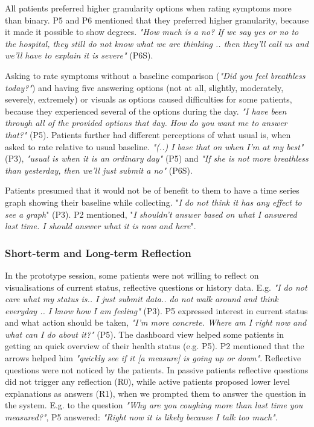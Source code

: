 All patients preferred higher granularity options when rating symptoms more than binary. P5 and P6 mentioned that they preferred higher granularity, because it made it possible to show degrees. \textit{"How much is a no? If we say yes or no to the hospital, they still do not know what we are thinking .. then they'll call us and we'll have to explain it is severe"} (P6S).

Asking to rate symptoms without a baseline comparison (\textit{"Did you feel breathless today?"}) and having five answering options (not at all, slightly, moderately, severely, extremely) or visuals as options caused difficulties for some patients, because they experienced several of the options during the day. \textit{"I have been through all of the provided options that day. How do you want me to answer that?"} (P5). Patients further had different perceptions of what usual is, when asked to rate relative to usual baseline. \textit{"(..) I base that on when I'm at my best"} (P3), \textit{"usual is when it is an ordinary day"} (P5) and \textit{"If she is not more breathless than yesterday, then we'll just submit a no"} (P6S).

Patients presumed that it would not be of benefit to them to have a time series graph showing their baseline while collecting. "\textit{I do not think it has any effect to see a graph}" (P3). P2 mentioned, "\textit{I shouldn't answer based on what I answered last time. I should answer what it is now and here}".

\subsubsection{Short-term and Long-term Reflection}
In the prototype session, some patients were not willing to reflect on visualisations of current status, reflective questions or history data. E.g. \textit{"I do not care what my status is.. I just submit data.. do not walk around and think everyday .. I know how I am feeling"} (P3). P5 expressed interest in current status and what action should be taken, \textit{"I'm more concrete. Where am I right now and what can I do about it?"} (P5). The dashboard view helped some patients in getting an quick overview of their health status (e.g. P5). P2 mentioned that the arrows helped him \textit{"quickly see if it [a measure] is going up or down"}. Reflective questions were not noticed by the patients. In passive patients reflective questions did not trigger any reflection (R0), while active patients proposed lower level explanations as answers (R1), when we prompted them to answer the question in the system. E.g. to the question \textit{"Why are you coughing more than last time you measured?"}, P5 answered: \textit{"Right now it is likely because I talk too much"}.

